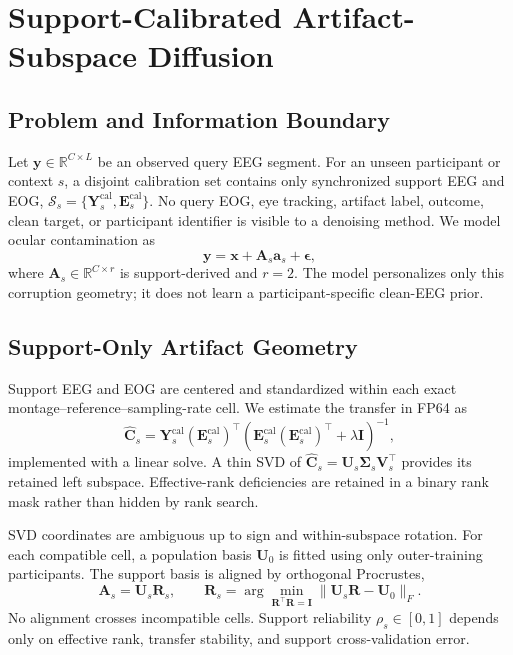 \section{Support-Calibrated Artifact-Subspace Diffusion}
\label{sec:method}

\subsection{Problem and Information Boundary}
Let $\mathbf{y}\in\mathbb{R}^{C\times L}$ be an observed query EEG segment.
For an unseen participant or context $s$, a disjoint calibration set contains
only synchronized support EEG and EOG,
$\mathcal{S}_s=\{\mathbf{Y}^{\mathrm{cal}}_s,
\mathbf{E}^{\mathrm{cal}}_s\}$.  No query EOG, eye tracking, artifact label,
outcome, clean target, or participant identifier is visible to a denoising
method.  We model ocular contamination as
\begin{equation}
  \mathbf{y}=\mathbf{x}+\mathbf{A}_s\mathbf{a}_s+\boldsymbol\epsilon,
  \label{eq:observation_subspace}
\end{equation}
where $\mathbf{A}_s\in\mathbb{R}^{C\times r}$ is support-derived and $r=2$.
The model personalizes only this corruption geometry; it does not learn a
participant-specific clean-EEG prior.

\subsection{Support-Only Artifact Geometry}
Support EEG and EOG are centered and standardized within each exact
montage--reference--sampling-rate cell.  We estimate the transfer in FP64 as
\begin{equation}
  \widehat{\mathbf{C}}_s=
  \mathbf{Y}^{\mathrm{cal}}_s(\mathbf{E}^{\mathrm{cal}}_s)^\top
  \left(\mathbf{E}^{\mathrm{cal}}_s(\mathbf{E}^{\mathrm{cal}}_s)^\top
  +\lambda\mathbf{I}\right)^{-1},
  \label{eq:ridge_transfer}
\end{equation}
implemented with a linear solve.  A thin SVD of
$\widehat{\mathbf{C}}_s=\mathbf{U}_s\boldsymbol\Sigma_s\mathbf{V}_s^\top$
provides its retained left subspace.  Effective-rank deficiencies are retained
in a binary rank mask rather than hidden by rank search.

SVD coordinates are ambiguous up to sign and within-subspace rotation.  For
each compatible cell, a population basis $\mathbf{U}_0$ is fitted using only
outer-training participants.  The support basis is aligned by orthogonal
Procrustes,
\begin{equation}
  \mathbf{A}_s=\mathbf{U}_s\mathbf{R}_s,\qquad
  \mathbf{R}_s=\arg\min_{\mathbf{R}^\top\mathbf{R}=\mathbf{I}}
  \|\mathbf{U}_s\mathbf{R}-\mathbf{U}_0\|_F.
\end{equation}
No alignment crosses incompatible cells.  Support reliability $\rho_s\in[0,1]$
depends only on effective rank, transfer stability, and support cross-validation
error.

